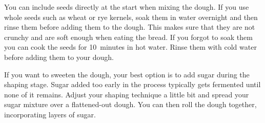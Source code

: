 You can include seeds directly at the start when mixing the dough. If you use
whole seeds such as wheat or rye kernels, soak them in water overnight and
then rinse them before adding them to the dough. This makes sure that they
are not crunchy and are soft enough when eating the bread. If you forgot to soak
them you can cook the seeds for 10~minutes in hot water. Rinse them with cold
water before adding them to your dough.

If you want to sweeten the dough, your best option is to add sugar during the
shaping stage. Sugar added too early in the process typically gets fermented until none of it
remains. Adjust your shaping technique a little bit and spread your sugar
mixture over a flattened-out dough. You can then roll the dough together,
incorporating layers of sugar.

